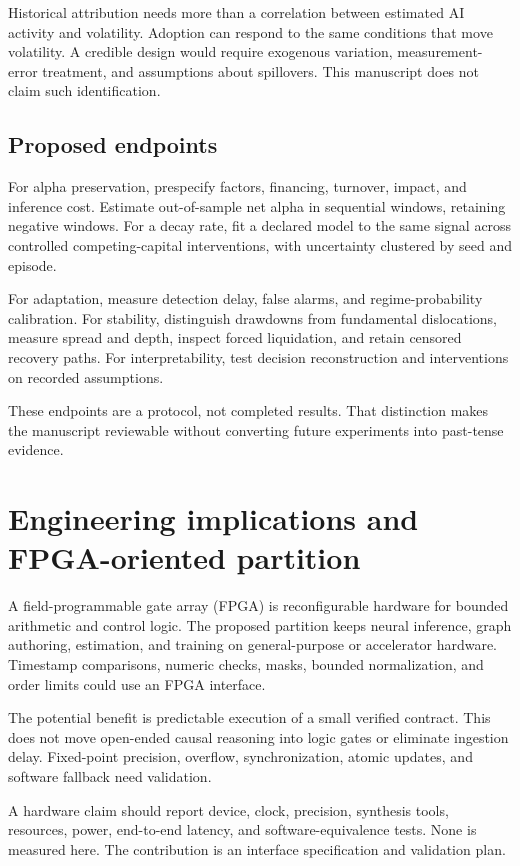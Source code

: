 Historical attribution needs more than a correlation between estimated AI activity and volatility. Adoption can respond to the same conditions that move volatility. A credible design would require exogenous variation, measurement-error treatment, and assumptions about spillovers. This manuscript does not claim such identification.

\subsection{Proposed endpoints}
For alpha preservation, prespecify factors, financing, turnover, impact, and inference cost. Estimate out-of-sample net alpha in sequential windows, retaining negative windows. For a decay rate, fit a declared model to the same signal across controlled competing-capital interventions, with uncertainty clustered by seed and episode.

For adaptation, measure detection delay, false alarms, and regime-probability calibration. For stability, distinguish drawdowns from fundamental dislocations, measure spread and depth, inspect forced liquidation, and retain censored recovery paths. For interpretability, test decision reconstruction and interventions on recorded assumptions.

These endpoints are a protocol, not completed results. That distinction makes the manuscript reviewable without converting future experiments into past-tense evidence.

\section{Engineering implications and FPGA-oriented partition}
A field-programmable gate array (FPGA) is reconfigurable hardware for bounded arithmetic and control logic. The proposed partition keeps neural inference, graph authoring, estimation, and training on general-purpose or accelerator hardware. Timestamp comparisons, numeric checks, masks, bounded normalization, and order limits could use an FPGA interface.

The potential benefit is predictable execution of a small verified contract. This does not move open-ended causal reasoning into logic gates or eliminate ingestion delay. Fixed-point precision, overflow, synchronization, atomic updates, and software fallback need validation.

A hardware claim should report device, clock, precision, synthesis tools, resources, power, end-to-end latency, and software-equivalence tests. None is measured here. The contribution is an interface specification and validation plan.

